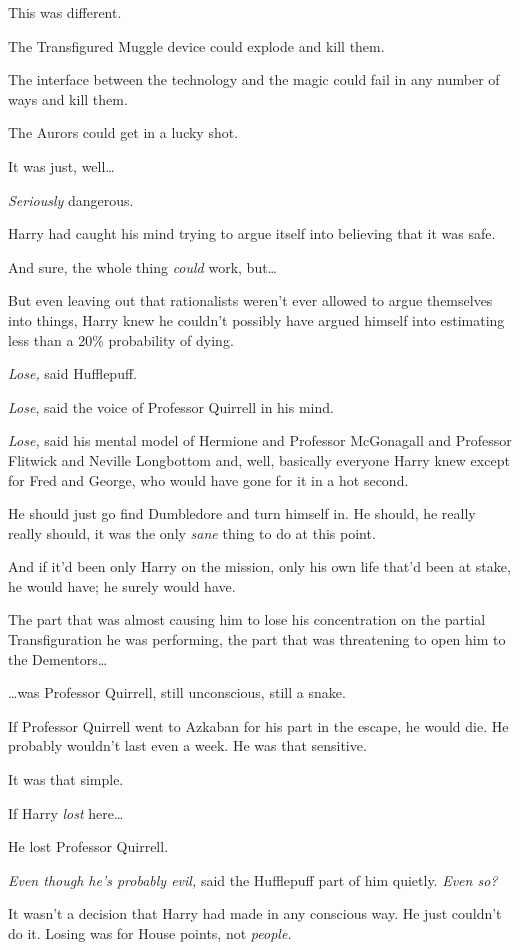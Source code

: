 This was different.

The Transfigured Muggle device could explode and kill them.

The interface between the technology and the magic could fail in any number of
ways and kill them.

The Aurors could get in a lucky shot.

It was just, well…

\emph{Seriously} dangerous.

Harry had caught his mind trying to argue itself into believing that it was
safe.

And sure, the whole thing \emph{could} work, but…

But even leaving out that rationalists weren’t ever allowed to argue themselves
into things, Harry knew he couldn’t possibly have argued himself into
estimating less than a 20\% probability of dying.

\emph{Lose,} said Hufflepuff.

\emph{Lose}, said the voice of Professor Quirrell in his mind.

\emph{Lose,} said his mental model of Hermione and Professor McGonagall and
Professor Flitwick and Neville Longbottom and, well, basically everyone Harry
knew except for Fred and George, who would have gone for it in a hot second.

He should just go find Dumbledore and turn himself in. He should, he really
really should, it was the only \emph{sane} thing to do at this point.

And if it’d been only Harry on the mission, only his own life that’d been at
stake, he would have; he surely would have.

The part that was almost causing him to lose his concentration on the partial
Transfiguration he was performing, the part that was threatening to open him to
the Dementors…

…was Professor Quirrell, still unconscious, still a snake.

If Professor Quirrell went to Azkaban for his part in the escape, he would die.
He probably wouldn’t last even a week. He was that sensitive.

It was that simple.

If Harry \emph{lost} here…

He lost Professor Quirrell.

\emph{Even though he’s probably evil,} said the Hufflepuff part of him quietly.
\emph{Even so?}

It wasn’t a decision that Harry had made in any conscious way. He just couldn’t
do it. Losing was for House points, not \emph{people.}

